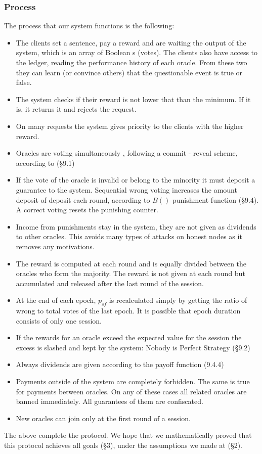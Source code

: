 \documentclass{article}
\begin{document}
\subsubsection{Process}
The process that our system functions is the following:\\
\begin{itemize}
\item The clients set a sentence, pay a reward and are waiting the output of the system, which is an array of Boolean s (votes). The clients also have access to the ledger, reading the performance history of each oracle. From these two they can learn (or convince others) that the questionable event is true or false.
\item The system checks if their reward is not lower that than the minimum. If it is, it returns it and rejects the request.
\item On many requests the system gives priority to the clients with the higher reward.
\item Oracles are voting simultaneously , following a commit - reveal scheme, according to (§9.1) 
\item If the vote of the oracle is invalid or belong to the minority it must deposit a guarantee to the system. Sequential wrong voting increases the amount deposit of deposit each round, according to $B()$ punishment function (§9.4). A correct voting resets the punishing counter.
\item Income from punishments stay in the system, they are not given as dividends to other oracles. This avoids many types of attacks on honest nodes as it removes any motivations.
\item The reward is computed at each round and is equally divided between the oracles who form the majority. The reward is not given at each round but accumulated and released after the last round of the session.
\item At the end of each epoch, $p_{sf}$ is recalculated simply by getting the ratio of wrong to total votes of the last epoch. It is possible that epoch duration consists of only one session.
\item If the rewards for an oracle exceed the expected value for the session the excess is slashed and kept by the system: Nobody is Perfect Strategy (§9.2)
\item Always dividends are given according to the payoff function (9.4.4)
\item Payments outside of the system are completely forbidden. The same is true for payments between oracles. On any of these cases all related oracles are banned immediately. All guarantees of them are confiscated.
\item New oracles can join only at the first round of a session.
\end{itemize}
The above complete the protocol. We hope that we mathematically proved that this protocol achieves all goals (§3), under the assumptions we made at (§2).
 
\end{document}
